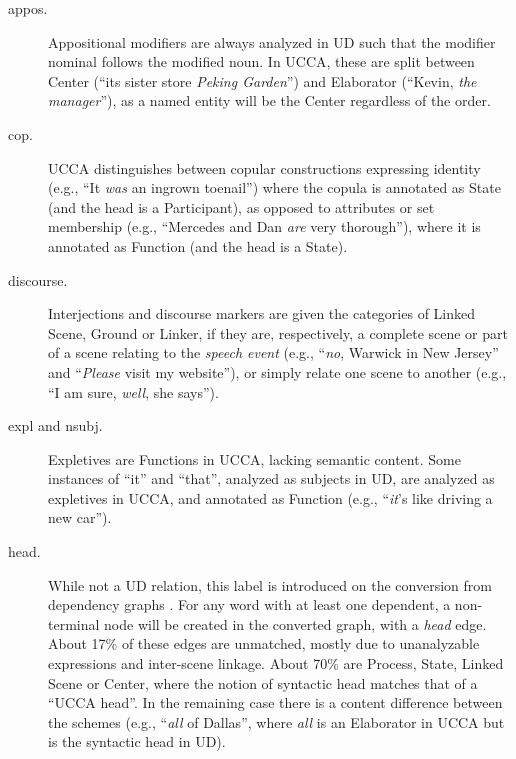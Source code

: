 \documentclass[11pt,a4paper]{article}
\begin{document}
\begin{description}
    \item[appos.]
    Appositional modifiers are always analyzed in UD such that
    the modifier nominal follows the modified noun.
    In UCCA, these are split between Center
    (``its sister store \textit{Peking Garden}'')
    and Elaborator (``Kevin, \textit{the manager}''),
    as a named entity will be the Center regardless of the order.
    \item[cop.]
    UCCA distinguishes between copular constructions expressing
    identity (e.g., ``It \textit{was} an ingrown toenail'') where the copula is annotated as State
    (and the head is a Participant),
    as opposed to attributes or set membership
    (e.g., ``Mercedes and Dan \textit{are} very thorough''), where it is annotated as Function
    (and the head is a State).    
    \item[discourse.]
    Interjections and discourse markers are given the categories of
    Linked Scene, Ground or Linker,
    if they are, respectively, a complete scene or part of a scene relating to the \textit{speech event}
    (e.g., ``\textit{no}, Warwick in New Jersey'' and
    ``\textit{Please} visit my website''),
    or simply relate one scene to another
    (e.g., ``I am sure, \textit{well}, she says'').
    \item[expl and nsubj.]
    Expletives are Functions in UCCA, lacking semantic content.
    Some instances of ``it'' and ``that'', analyzed as subjects in UD,
    are analyzed as expletives in UCCA, and annotated as Function
    (e.g., ``\textit{it}'s like driving a new car'').    
    \item[head.]
    While not a UD relation, this label is introduced on the conversion from dependency graphs
    \cite{hershcovich2018multitask}.
    For any word with at least one dependent,
    a non-terminal node will be created in the converted graph, with a \textit{head} edge.
    About 17\% of these edges are unmatched, mostly due to unanalyzable expressions and inter-scene linkage.
    About 70\% are Process, State, Linked Scene or Center,
    where the notion of syntactic head matches that of a ``UCCA head''.
    In the remaining case there is a content difference between the schemes
    (e.g., ``\textit{all} of Dallas'', where \textit{all} is an Elaborator
    in UCCA but is the syntactic head in UD).
\end{description}
\end{document}

